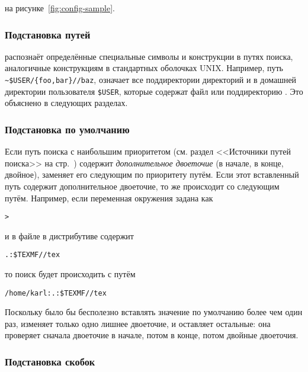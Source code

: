 \documentclass{article}
\begin{document}

\else
на рисунке~\ref{fig:config-sample}.
\fi

\subsubsection{Подстановка путей}
\label{sec:path-expansion}


\KPS{} распознаёт определённые специальные символы и конструкции в
путях поиска, аналогичные конструкциям в стандартных оболочках
UNIX. Например,  путь
\verb+~$USER/{foo,bar}//baz+, означает все поддиректории директорий 
 и  в домашней директории пользователя
\texttt{\$USER}, которые содержат файл или поддиректорию .
Это объяснено в следующих разделах.
\subsubsection{Подстановка по умолчанию}
\label{sec:default-expansion}


Если путь поиска с наибольшим приоритетом (см. раздел <<Источники путей
поиска>> на стр.~\pageref{sec:path-sources}) содержит \emph{дополнительное
  двоеточие} (в начале, в конце, двойное), \KPS{} заменяет его
следующим по приоритету путём. Если этот вставленный путь содержит
дополнительное двоеточие, то же происходит со следующим путём.
Например, если переменная окружения задана как


\begin{alltt}
> 
\end{alltt}
и  в файле  в дистрибутиве содержит

\begin{alltt}
  .:\$TEXMF//tex
\end{alltt}
то поиск будет происходить с путём

\begin{alltt}
  /home/karl:.:\$TEXMF//tex
\end{alltt}

Поскольку было бы бесполезно вставлять значение по умолчанию более чем
один раз,  \KPS{} изменяет только одно лишнее двоеточие, и оставляет
остальные: она проверяет сначала двоеточие в начале, потом в конце,
потом двойные двоеточия.

\subsubsection{Подстановка скобок}
\label{sec:brace-expansion}
\end{document}
